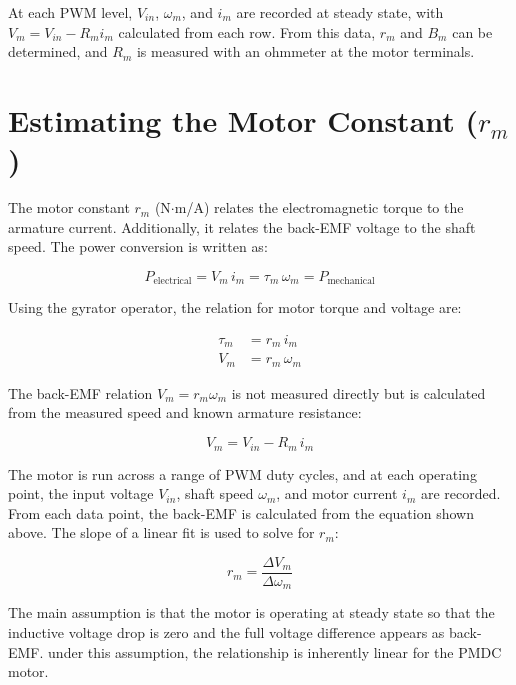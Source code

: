 \documentclass{article}
\begin{document}
\noindent At each PWM level, $V_{in}$, $\omega_m$, and $i_m$ are recorded at steady state, with $V_m = V_{in} - R_m i_m$ calculated from each row. From this data, $r_m$ and $B_m$ can be determined, and $R_m$ is measured with an ohmmeter at the motor terminals.

\section{Estimating the Motor Constant ($r_m$)}

The motor constant $r_m$ (N$\cdot$m/A) relates the electromagnetic torque to the armature current. Additionally, it relates the back-EMF voltage to the shaft speed. The power conversion is written as:

\begin{equation}
    P_{\text{electrical}} = V_m\, i_m = \tau_m\, \omega_m = P_{\text{mechanical}}
    \label{eq:power_balance}
\end{equation}

\noindent Using the gyrator operator, the relation for motor torque and voltage are:

\begin{align}
    \tau_m &= r_m\, i_m \label{eq:torque_const} \\
    V_m    &= r_m\, \omega_m \label{eq:backemf_const}
\end{align}

\noindent The back-EMF relation $V_m = r_m \omega_m$ is not measured directly but is calculated from the measured speed and known armature resistance:

\begin{equation}
    V_m = V_{in} - R_m\, i_m
    \label{eq:backemf_calc}
\end{equation}

\noindent The motor is run across a range of PWM duty cycles, and at each operating point, the input voltage $V_{in}$, shaft speed $\omega_m$, and motor current $i_m$ are recorded. From each data point, the back-EMF is calculated from the equation shown above. The slope of a linear fit is used to solve for $r_m$:

\begin{equation}
    r_m = \frac{\Delta V_m}{\Delta \omega_m}
    \label{eq:rm_regression}
\end{equation}

\noindent The main assumption is that the motor is operating at steady state so that the inductive voltage drop is zero and the full voltage difference appears as back-EMF. under this assumption, the relationship is inherently linear for the PMDC motor.
\end{document}
